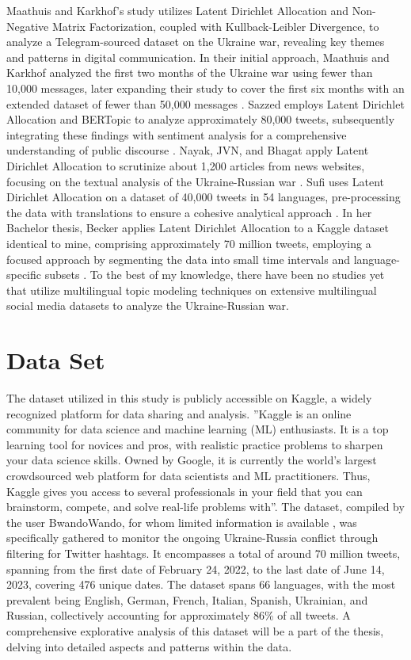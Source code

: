 \documentclass[
    11pt,
    a4paper,
    egregdoesnotlikesansseriftitles,
    toc=chapterentrywithdots,
    oneside,openright,
    titlepage,
    parskip=half,
    headings=normal,  %
    listof=totoc,
    bibliography=totoc,
    index=totoc,
    captions=tableheading,  %
    chapterprefix,
    listof=flat,
    final
]{scrbook}
\begin{document}
Maathuis and Karkhof's study utilizes Latent Dirichlet Allocation and Non-Negative Matrix Factorization, coupled with Kullback-Leibler Divergence, to analyze a Telegram-sourced dataset on the Ukraine war, revealing key themes and patterns in digital communication.
In their initial approach, Maathuis and Karkhof analyzed the first two months of the Ukraine war using fewer than 10,000 messages, later expanding their study to cover the first six months with an extended dataset of fewer than 50,000 messages \cite{TopicModellingTelegram1,TopicModellingTelegram2}. 
Sazzed employs Latent Dirichlet Allocation and BERTopic to analyze approximately 80,000 tweets, subsequently integrating these findings with sentiment analysis for a comprehensive understanding of public discourse \cite{TopicTwitterLDABERt}. 
Nayak, JVN, and Bhagat apply Latent Dirichlet Allocation to scrutinize about 1,200 articles from news websites, focusing on the textual analysis of the Ukraine-Russian war \cite{TopicModelingconflig}.
Sufi uses Latent Dirichlet Allocation on a dataset of 40,000 tweets in 54 languages, pre-processing the data with translations to ensure a cohesive analytical approach \cite{SocialMediaanalysis}.
In her Bachelor thesis, Becker applies Latent Dirichlet Allocation to a Kaggle dataset identical to mine, comprising approximately 70 million tweets, employing a focused approach by segmenting the data into small time intervals and language-specific subsets \cite{Ivanna}.
To the best of my knowledge, there have been no studies yet that utilize multilingual topic modeling techniques on extensive multilingual social media datasets to analyze the Ukraine-Russian war.


{\let\clearpage\relax \chapter{Data Set}}
The dataset utilized in this study is publicly accessible on Kaggle, a widely recognized platform for data sharing and analysis. ''Kaggle is an online community for data science and machine learning (ML) enthusiasts. It is a top learning tool for novices and pros, with realistic practice problems to sharpen your data science skills.
Owned by Google, it is currently the world’s largest crowdsourced web platform for data scientists and ML practitioners. Thus, Kaggle gives you access to several professionals in your field that you can brainstorm, compete, and solve real-life problems with''\cite{Kaggle}.
The dataset, compiled by the user BwandoWando, for whom limited information is available \cite{bwandowando}, was specifically gathered to monitor the ongoing Ukraine-Russia conflict through filtering for Twitter hashtags.
It encompasses a total of around 70 million tweets, spanning from the first date of February 24, 2022, to the last date of June 14, 2023, covering 476 unique dates. The dataset spans 66 languages, with the most prevalent being English, German, French, Italian, Spanish, Ukrainian, and Russian, collectively accounting for approximately 86\% of all tweets. A comprehensive explorative analysis of this dataset will be a part of the thesis, delving into detailed aspects and patterns within the data.
\end{document}
